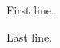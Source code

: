 \documentclass[a4paper,oneside,11pt]{article}
\begin{document}
First line.


Last line.
\end{document}
